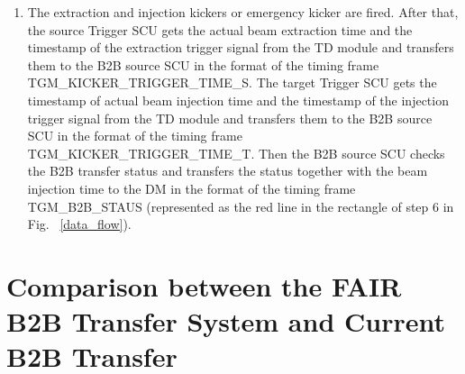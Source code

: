 \begin{enumerate}
\item  The extraction and injection kickers or emergency kicker are fired. After that, the source Trigger SCU gets the actual beam extraction time and the timestamp of the extraction trigger signal from the TD module and transfers them to the B2B source SCU in the format of the timing frame TGM\_KICKER\_TRIGGER\_TIME\_S. The target Trigger SCU gets the timestamp of actual beam injection time and the timestamp of the injection trigger signal from the TD module and transfers them to the B2B source SCU in the format of the timing frame TGM\_KICKER\_TRIGGER\_TIME\_T. Then the B2B source SCU checks the B2B transfer status and transfers the status together with the beam injection time to the DM in the format of the timing frame TGM\_B2B\_STAUS (represented as the red line in the rectangle of step 6 in Fig. ~\ref{data_flow}).

\end{enumerate}

\section{Comparison between the FAIR B2B Transfer System and Current B2B Transfer}
\label{cpt_comp}


